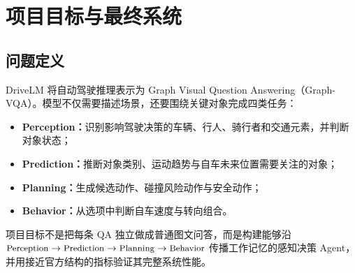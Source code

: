 \documentclass[UTF8,a4paper,11pt]{ctexart}
\begin{document}
\begin{abstract}
本报告总结 RadarMind-DriveLM 从最初数据复现到完整 Graph-VLM Agent 的技术演进。项目以 DriveLM-nuScenes v1.1 为数据基础，将单帧六路同步相机图像组织为 26,095 条训练 QA 与 3,355 条场景隔离开发集 QA，覆盖 Perception、Prediction、Planning、Behavior 四类任务。模型主线由 Qwen2.5-VL-7B-Instruct 出发，依次完成纯交叉熵 LoRA SFT、任务均衡且带 CE anchor 的保守 DPO、四任务 Mixture of LoRA（MoL）、Planning trajectory GRPO/GSPO、四阶段 Graph trajectory SFT，以及受 InternVL4Drive 启发的固定专家路由。

零样本基模的本地 DriveLM-DS Final 为 0.257961；六相机垂域 CE-SFT 提升到 0.594636；保守 DPO 提升到 0.596356；四专家 MoL 提升到 0.608245。GRPO/GSPO 在 Planning 子协议上改善 trajectory reward，但接回完整系统后未超过 MoL。Graph-SFT 显著改善坐标 grounding，却因 teacher forcing 与 predicted-context 的暴露偏差未通过 same-ID 晋级门槛。最终系统把 Graph-A 只用于每帧第一个重要对象 anchor，把 MoL-700 用于其余 2,888 条下游 QA，在 3,355 条完整开发集上取得 0.612293；严格 1,848-ID 共同子集 Final 同样由 0.609563 提升到 0.610557。因此 v0.43 是当前本地全系统基线。

报告同时保留具有方法论价值的负实验：增加视觉 token、标准 DPO、grounding DPO、全系统 GRPO/GSPO、Graph+anchor 混合训练、显式六相机拓扑提示和 image-only bbox 辅助监督均未通过冻结晋级门槛。这些结果共同说明：DriveLM 的主要困难不是单一语言指标，而是 graph gating、对象召回、任务梯度冲突和上游误差传播；可靠模型选择必须结合完整 Final、predicted-context rollout 与 same-ID 公平审计。
\end{abstract}

\tableofcontents
\clearpage

\section{项目目标与最终系统}
\subsection{问题定义}
DriveLM 将自动驾驶推理表示为 Graph Visual Question Answering（Graph-VQA）。模型不仅需要描述场景，还要围绕关键对象完成四类任务：
\begin{itemize}
  \item \textbf{Perception：}识别影响驾驶决策的车辆、行人、骑行者和交通元素，并判断对象状态；
  \item \textbf{Prediction：}推断对象类别、运动趋势与自车未来位置需要关注的对象；
  \item \textbf{Planning：}生成候选动作、碰撞风险动作与安全动作；
  \item \textbf{Behavior：}从选项中判断自车速度与转向组合。
\end{itemize}
项目目标不是把每条 QA 独立做成普通图文问答，而是构建能够沿
\(
\small\text{Perception}\rightarrow\text{Prediction}\rightarrow\text{Planning}\rightarrow\text{Behavior}
\)
传播工作记忆的感知决策 Agent，并用接近官方结构的指标验证其完整系统性能。
\end{document}
